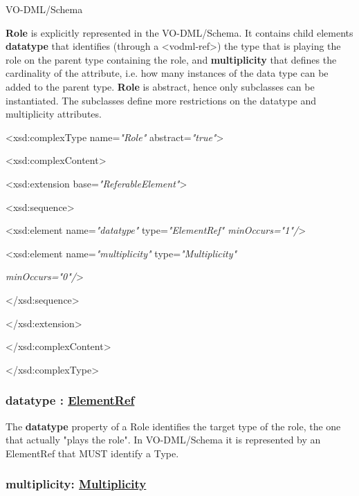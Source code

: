 \documentclass[10pt,a4paper]{ivoa}
\begin{document}
VO-DML/Schema

\textbf{Role} is explicitly represented in the VO-DML/Schema. It
contains child elements \textbf{datatype} that identifies (through a
\textless vodml-ref\textgreater) the type that is playing the role on
the parent type containing the role, and \textbf{multiplicity} that
defines the cardinality of the attribute, i.e. how many instances of the
data type can be added to the parent type. \textbf{Role} is abstract,
hence only subclasses can be instantiated. The subclasses define more
restrictions on the datatype and multiplicity attributes.

\textless xsd:complexType name=\emph{"Role"}
abstract=\emph{"true"}\textgreater{}

\textless xsd:complexContent\textgreater{}

\textless xsd:extension base=\emph{"ReferableElement"}\textgreater{}

\textless xsd:sequence\textgreater{}

\textless xsd:element name=\emph{"datatype"} type=\emph{"ElementRef"
minOccurs="1"/}\textgreater{}

\textless xsd:element name=\emph{"multiplicity"}
type=\emph{"Multiplicity"}

\emph{minOccurs="0"/}\textgreater{}

\textless/xsd:sequence\textgreater{}

\textless/xsd:extension\textgreater{}

\textless/xsd:complexContent\textgreater{}

\textless/xsd:complexType\textgreater{}

\hypertarget{datatype-elementref}{%
\subsubsection{\texorpdfstring{datatype :
\protect\hyperlink{elementref}{ElementRef}}{datatype : ElementRef}}\label{datatype-elementref}}

The \textbf{datatype} property of a Role identifies the target type of
the role, the one that actually "plays the role". In VO-DML/Schema it is
represented by an ElementRef that MUST identify a Type.

\hypertarget{multiplicity-multiplicity}{%
\subsubsection{\texorpdfstring{multiplicity:
\protect\hyperlink{multiplicity}{Multiplicity}}{multiplicity: Multiplicity}}\label{multiplicity-multiplicity}}
\end{document}
